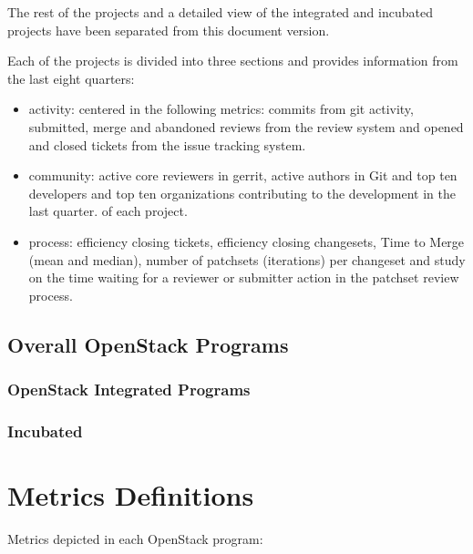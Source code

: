 \documentclass[a4wide,11pt]{report}
\begin{document}
The rest of the projects and a detailed view of the integrated and incubated projects have been
separated from this document version.

Each of the projects is divided into three sections and provides information from the last eight quarters: 
\begin{itemize}
\item activity: centered in the following metrics: commits from git activity, submitted, merge and abandoned reviews from the review system and
opened and closed tickets from the issue tracking system. 
\item community: active core reviewers in gerrit, active authors in Git and top ten developers and top ten organizations contributing to the development in the last quarter.
of each project.
\item process: efficiency closing tickets, efficiency closing changesets, Time to Merge (mean and median), number of patchsets (iterations) per changeset and study on the time waiting for a reviewer or submitter action in the patchset review process.
\end{itemize}


\newpage
\section{Overall OpenStack Programs}


\newpage
\subsection{OpenStack Integrated Programs}


\newpage
\subsection{Incubated}




\appendix{}

\chapter{Metrics Definitions}
\label{chap:metrics_definitions}

Metrics depicted in each OpenStack program:
\end{document}
